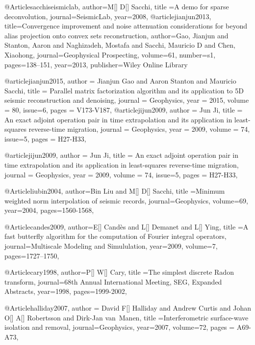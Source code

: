 @Article{sacchiseismiclab,
  author={M[] D[] Sacchi},
  title ={A demo for sparse deconvolution},
  journal={SeismicLab},
  year={2008},
}
@article{jianjun2013,
  title={Convergence improvement and noise attenuation considerations for beyond alias projection onto convex sets reconstruction},
  author={Gao, Jianjun and Stanton, Aaron and Naghizadeh, Mostafa and Sacchi, Mauricio D and Chen, Xiaohong},
  journal={Geophysical Prospecting},
  volume={61},
  number={s1},
  pages={138--151},
  year={2013},
  publisher={Wiley Online Library}
}

@article{jianjun2015,
  author =	 {Jianjun Gao and Aaron Stanton and Mauricio Sacchi},
  title =	 {Parallel matrix factorization algorithm and its application to 5{D} seismic reconstruction and denoising},
  journal = 	 {Geophysics},
  year = 	 2015,
  volume =	 80,
    issue=6,
  pages =	 {V173-V187},
}
@article{jijun2009,
  author =	 {Jun Ji},
  title =	 {An exact adjoint operation pair in time extrapolation and its application in least-squares reverse-time migration},
  journal = 	 {Geophysics},
  year = 	 2009,
  volume =	 74,
    issue=5,
  pages =	 {H27-H33},
}

@article{jijun2009,
  author =	 {Jun Ji},
  title =	 {An exact adjoint operation pair in time extrapolation and its application in least-squares reverse-time migration},
  journal = 	 {Geophysics},
  year = 	 2009,
  volume =	 74,
    issue=5,
  pages =	 {H27-H33},
}

@Article{liubin2004,
  author={Bin Liu and M[] D[] Sacchi},
  title ={Minimum weighted norm interpolation of seismic records},
  journal={Geophysics},
  volume=69,
  year=2004,
  pages={1560-1568},
}

@Article{candes2009,
  author={E[] Cand\`{e}s and L[] Demanet and L[] Ying},
  title ={A fast butterfly algorithm for the computation of {F}ourier integral operators},
  journal={Multiscale Modeling and Simululation},
  year=2009,
  volume=7,
  pages={1727–1750},
}

@Article{cary1998,
  author={P[] W[] Cary},
  title ={The simplest discrete Radon transform},
  journal={68th Annual International Meeting, SEG, Expanded Abstracts},
  year=1998,
  pages={1999-2002},
}




@Article{halliday2007,
  author = {David F[] Halliday and Andrew Curtis  and Johan O[] A[] Robertsson and Dirk-Jan van~Manen},
  title ={Interferometric surface-wave isolation and removal},
  journal={Geophysics},
  year=2007,
  volume={72},
  pages = {A69-A73},
}


